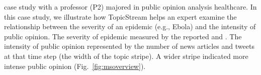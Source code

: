  case study  with a professor (P2)  majored in public opinion analysis  healthcare.
In this case study, we illustrate how TopicStream helps an expert examine the relationship between the severity of an epidemic (e.g., Ebola) and the intensity of public opinion.
The severity of  epidemic  measured by the reported  and .
The intensity of public opinion  represented by the number of news articles and tweets at that time step (the width of the topic stripe).
A wider stripe indicated more intense public opinion (Fig.~\ref{fig:msoverview}).

